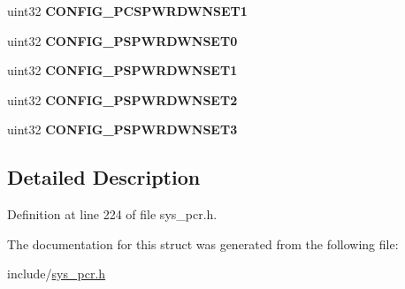 \begin{DoxyCompactItemize}
uint32 {\bfseries C\+O\+N\+F\+I\+G\+\_\+\+P\+C\+S\+P\+W\+R\+D\+W\+N\+S\+E\+T1}
\item 
\mbox{\label{structpcr__config__reg_a424d0c346631f6262163a3d5d71a1934}} 
uint32 {\bfseries C\+O\+N\+F\+I\+G\+\_\+\+P\+S\+P\+W\+R\+D\+W\+N\+S\+E\+T0}
\item 
\mbox{\label{structpcr__config__reg_ac86cfcbb1653b7fa8634963a50d302d3}} 
uint32 {\bfseries C\+O\+N\+F\+I\+G\+\_\+\+P\+S\+P\+W\+R\+D\+W\+N\+S\+E\+T1}
\item 
\mbox{\label{structpcr__config__reg_ad6531d074c6475fa21038ee595447d8f}} 
uint32 {\bfseries C\+O\+N\+F\+I\+G\+\_\+\+P\+S\+P\+W\+R\+D\+W\+N\+S\+E\+T2}
\item 
\mbox{\label{structpcr__config__reg_a3732e745fb470f4486679834f6fef761}} 
uint32 {\bfseries C\+O\+N\+F\+I\+G\+\_\+\+P\+S\+P\+W\+R\+D\+W\+N\+S\+E\+T3}
\end{DoxyCompactItemize}


\subsection{Detailed Description}


Definition at line 224 of file sys\+\_\+pcr.\+h.



The documentation for this struct was generated from the following file\+:\begin{DoxyCompactItemize}
\item 
include/\mbox{\hyperlink{sys__pcr_8h}{sys\+\_\+pcr.\+h}}\end{DoxyCompactItemize}
